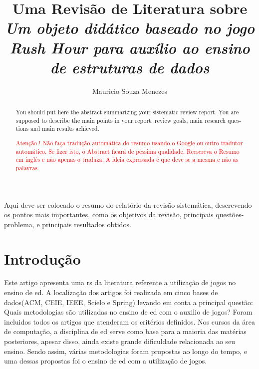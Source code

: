 \documentclass[12pt]{article}
\title{Uma Revisão de Literatura sobre \textit{Um objeto didático baseado no jogo Rush Hour para auxílio ao ensino de estruturas de dados}}
\author{Mauricio Souza Menezes\\}
\begin{document}

\maketitle

\begin{resumo}
    Aqui deve ser colocado o resumo do relatório da revisão sistemática, descrevendo os pontos mais importantes, como os objetivos da revisão, principais questões-problema, e principais resultados obtidos.
\end{resumo}


\begin{abstract}
\begin{otherlanguage}{english}
    You should put here the abstract summarizing your sistematic review report. You are supposed to describe the main points in your report: review goals, main research questions and main results achieved. 
\end{otherlanguage} \textcolor{red}{Atenção ! Não faça tradução automática do resumo usando o Google ou outro tradutor automático. Se fizer isto, o Abstract ficará de péssima qualidade. Reescreva o Resumo em inglês e não apenas o traduza. A ideia expressada é que deve se a mesma e não as palavras.}
\end{abstract}


\section{Introdução}
Este artigo apresenta uma \gls{rs} da literatura referente a utilização de jogos no ensino de \gls{ed}. A localização dos artigos foi realizada em cinco bases de dados(ACM, CEIE, IEEE, Scielo e Spring) levando em conta a principal questão: Quais metodologias são utilizadas no ensino de \gls{ed} com o auxilio de jogos? Foram incluidos todos os artigos que atenderam os critérios definidos.
Nos cursos da área de computação, a disciplina de \gls{ed} serve como base para a maioria das matérias posteriores, apesar disso, ainda existe grande dificuldade relacionada ao seu ensino. Sendo assim, várias metodologias foram propostas ao longo do tempo, e uma dessas propostas foi o ensino de \gls{ed} com a utilização de jogos.
\end{document}
